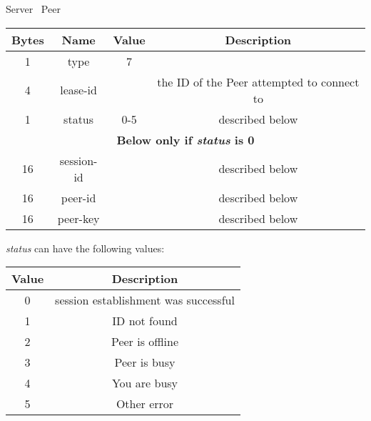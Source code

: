 \begin{center}
    Server \textrightarrow\ Peer\\
    \begin{tabular}{|c|c|c|c|}
        \hline
        \textbf{Bytes} & \textbf{Name} & \textbf{Value} & \textbf{Description}                       \\
        \hline
        1              & type          & 7              &                                            \\
        \hline
        4              & lease-id      &                & the ID of the Peer attempted to connect to \\
        \hline
        1              & status        & 0-5            & described below                            \\
        \hline
        \multicolumn{4}{|c|}{\textbf{Below only if \emph{status} is 0} } \\
        \hline
        16             & session-id    &                & described below                            \\
        \hline
        16             & peer-id       &                & described below                            \\
        \hline
        16             & peer-key      &                & described below                            \\
        \hline
    \end{tabular}
\end{center}

\emph{status} can have the following values:

\begin{center}
    \begin{tabular}{|c|c|}
        \hline
        \textbf{Value} & \textbf{Description}                 \\
        \hline
        0              & session establishment was successful \\
        \hline
        1              & ID not found                         \\
        \hline
        2              & Peer is offline                      \\
        \hline
        3              & Peer is busy                         \\
        \hline
        4              & You are busy                         \\
        \hline
        5              & Other error                          \\
        \hline
    \end{tabular}
\end{center}

